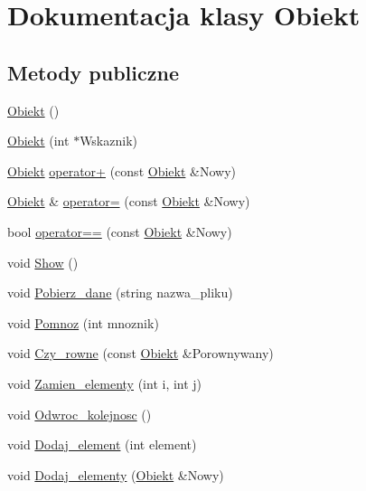 \hypertarget{class_obiekt}{\section{\-Dokumentacja klasy \-Obiekt}
\label{class_obiekt}
}
\subsection*{\-Metody publiczne}
\begin{DoxyCompactItemize}
\item 
\hyperlink{class_obiekt_ac8e27a872226e2b55c6f42c0677e5d00}{\-Obiekt} ()
\item 
\hyperlink{class_obiekt_a8e2e3537c41235fe165117c3a09b9669}{\-Obiekt} (int $\ast$\-Wskaznik)
\item 
\hyperlink{class_obiekt}{\-Obiekt} \hyperlink{class_obiekt_ae9b27f251c823ca866ae63479a901a7a}{operator+} (const \hyperlink{class_obiekt}{\-Obiekt} \&\-Nowy)
\item 
\hyperlink{class_obiekt}{\-Obiekt} \& \hyperlink{class_obiekt_a75a7336fe08d7ba99ad507371470c33f}{operator=} (const \hyperlink{class_obiekt}{\-Obiekt} \&\-Nowy)
\item 
bool \hyperlink{class_obiekt_a1dd7d24ba8cce83355da18a75c89deca}{operator==} (const \hyperlink{class_obiekt}{\-Obiekt} \&\-Nowy)
\item 
void \hyperlink{class_obiekt_a59b1b7dcf398424366b132d5ae7ac087}{\-Show} ()
\item 
void \hyperlink{class_obiekt_a481091a905fc01050b9bf782502efabb}{\-Pobierz\-\_\-dane} (string nazwa\-\_\-pliku)
\item 
void \hyperlink{class_obiekt_aae43ab1926c5c6ccd82d0908c33474da}{\-Pomnoz} (int mnoznik)
\item 
void \hyperlink{class_obiekt_a3e8670b709172fc0a63df917f41c98cf}{\-Czy\-\_\-rowne} (const \hyperlink{class_obiekt}{\-Obiekt} \&\-Porownywany)
\item 
void \hyperlink{class_obiekt_a46517777b9e80cc1ddc434d67922fe9a}{\-Zamien\-\_\-elementy} (int i, int j)
\item 
void \hyperlink{class_obiekt_a28ec1565e960673b6f762c3488aa7ca6}{\-Odwroc\-\_\-kolejnosc} ()
\item 
void \hyperlink{class_obiekt_ac0f67824826a384077bc30e51552a9a7}{\-Dodaj\-\_\-element} (int element)
\item 
void \hyperlink{class_obiekt_ae70037bf4b1f582c7a1e09c16314ac83}{\-Dodaj\-\_\-elementy} (\hyperlink{class_obiekt}{\-Obiekt} \&\-Nowy)
\end{DoxyCompactItemize}
